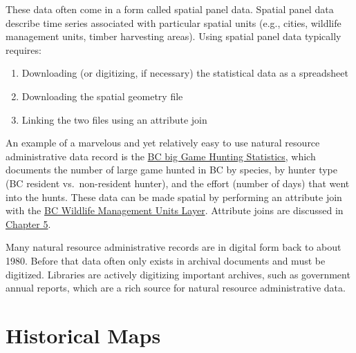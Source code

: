 \documentclass[
]{book}
\providecommand{\tightlist}{%
  \setlength{\itemsep}{0pt}\setlength{\parskip}{0pt}}
\begin{document}
These data often come in a form called spatial panel data. Spatial panel data describe time series associated with particular spatial units (e.g., cities, wildlife management units, timber harvesting areas). Using spatial panel data typically requires:

\begin{enumerate}
\def\labelenumi{\arabic{enumi}.}
\tightlist
\item
  Downloading (or digitizing, if necessary) the statistical data as a spreadsheet
\item
  Downloading the spatial geometry file
\item
  Linking the two files using an attribute join
\end{enumerate}

An example of a marvelous and yet relatively easy to use natural resource administrative data record is the \href{https://catalogue.data.gov.bc.ca/dataset/big-game-harvest-statistics-1976-to-current}{BC big Game Hunting Statistics}, which documents the number of large game hunted in BC by species, by hunter type (BC resident vs.~non-resident hunter), and the effort (number of days) that went into the hunts. These data can be made spatial by performing an attribute join with the \href{https://catalogue.data.gov.bc.ca/dataset/wildlife-management-units}{BC Wildlife Management Units Layer}. Attribute joins are discussed in \href{https://www.opengeomatics.ca/relational-databases.html\#joining-relations}{Chapter 5}.

Many natural resource administrative records are in digital form back to about 1980. Before that data often only exists in archival documents and must be digitized. Libraries are actively digitizing important archives, such as government annual reports, which are a rich source for natural resource administrative data.

\hypertarget{historical-maps}{%
\section{Historical Maps}\label{historical-maps}}
\end{document}

